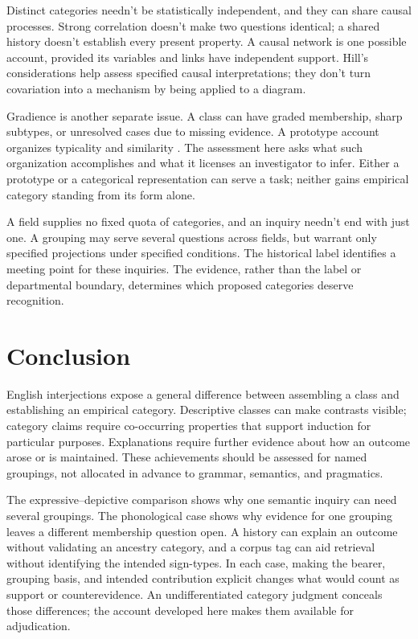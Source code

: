 \documentclass[12pt]{article}
\begin{document}
Distinct categories needn't be statistically independent, and they can
share causal processes. Strong correlation doesn't make two questions
identical; a shared history doesn't establish every present property.
A causal network is one possible account, provided its variables and
links have independent support. Hill's considerations help assess
specified causal interpretations; they don't turn covariation into
a mechanism by being applied to a diagram.

Gradience is another separate issue. A class can have graded membership,
sharp subtypes, or unresolved cases due to missing evidence. A prototype
account organizes typicality and similarity \citep{rosch1975,taylor2003}.
The assessment here asks what such organization accomplishes and what
it licenses an investigator to infer. Either a prototype or a categorical
representation can serve a task; neither gains empirical category standing
from its form alone.

A field supplies no fixed quota of categories, and an inquiry
needn't end with just one. A grouping may serve several questions across
fields, but warrant only specified projections under specified conditions.
The historical label  identifies a meeting point for
these inquiries. The evidence, rather than the label or departmental
boundary, determines which proposed categories deserve recognition.

\section{Conclusion}\label{sec:conclusion}

English interjections expose a general difference between assembling a
class and establishing an empirical category. Descriptive classes can
make contrasts visible; category claims require co-occurring properties
that support induction for particular purposes. Explanations require
further evidence about how an outcome arose or is maintained. These
achievements should be assessed for named groupings, not allocated in
advance to grammar, semantics, and pragmatics.

The expressive--depictive comparison shows why one semantic inquiry can
need several groupings. The phonological case shows why evidence for
one grouping leaves a different membership question open. A history
can explain an outcome without validating an ancestry category, and a
corpus tag can aid retrieval without identifying the intended sign-types.
In each case, making the bearer, grouping basis, and intended contribution
explicit changes what would count as support or counterevidence.
An undifferentiated category judgment conceals those differences; the
account developed here makes them available for adjudication.
\end{document}
